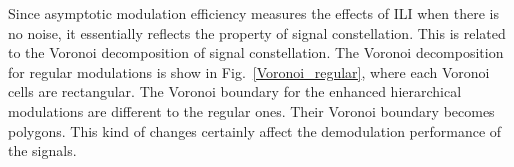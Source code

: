 \documentclass[10pt,fleqn, twocolumn]{IEEEtran}
\begin{document}
Since asymptotic modulation efficiency measures the effects of ILI
when there is no noise, it essentially reflects the property of
signal constellation. This is related to the Voronoi decomposition
of signal constellation. The Voronoi decomposition for regular
modulations is show in Fig.~\ref{Voronoi_regular}, where each
Voronoi cells are rectangular. The Voronoi boundary for the
enhanced hierarchical modulations are different to the regular
ones. Their Voronoi boundary becomes polygons. This kind of
changes certainly affect the demodulation performance of the
signals.
\begin{figure} 
\end{figure}
\begin{figure} 
\end{figure}
\end{document}
